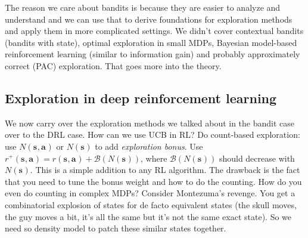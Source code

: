 \documentclass{report}
\begin{document}
The reason we care about bandits is because they are easier to analyze and understand and
we can use that to derive foundations for exploration methods and apply them in more complicated settings.
We didn't cover contextual bandits (bandits with state), optimal exploration in small MDPs,
Bayesian model-based reinforcement learning (similar to information gain) and probably approximately correct (PAC) exploration.
That goes more into the theory.

\subsection{Exploration in deep reinforcement learning}
We now carry over the exploration methods we talked about in the bandit case over to the DRL case.
How can we use UCB in RL?
Do count-based exploration:
use $N\left( \bm{s}_{}, \bm{a}_{} \right)$ or $N(\bm{s}_{})$ to add \textit{exploration bonus}.
Use $ r^+ (\bm{s}_{}, \bm{a}_{}) = r(\bm{s}_{}, \bm{a}_{}) + \mathcal{B} (N(\bm{s}_{}))  $,
where $\mathcal{B}(N(\bm{s}_{}))$ should decrease with $N(\bm{s}_{})$.
This is a simple addition to any RL algorithm. The drawback is the fact that you need to tune the bonus weight and how to do the counting.
How do you even do counting in complex MDPs? Consider Montezuma's revenge. 
You get a combinatorial explosion of states for de facto equivalent states (the skull moves, the guy moves a bit,
it's all the same but it's not the same exact state).
So we need so density model to patch these similar states together.
\end{document}
